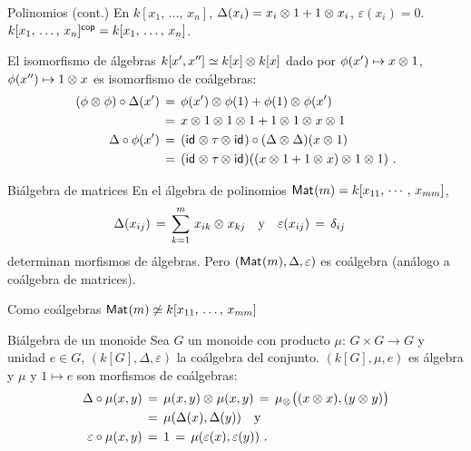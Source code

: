 \begin{frame}{Polinomios (cont.)}
	En $k[x_1,\,\dots,\,x_n]$,
	$\Delta(x_i)=x_i\otimes_{} 1 + 1\otimes_{} x_i$, $\varepsilon(x_i)=0$.
	$k[x_1,\,\dots,\,x_n]^{\mathsf{cop}}=k[x_1,\,\dots,\,x_n]$.

	\begin{obsPolinomios}\label{obs:polinomios}
		El isomorfismo de \'{a}lgebras
		$k[x',x'']\simeq k[x]\otimes_{} k[x]$ dado por
		$\phi(x')\mapsto x\otimes_{} 1$, $\phi(x'')\mapsto 1\otimes_{} x$ es
		isomorfismo de co\'{a}lgebras:
		\begin{align*}
			(\phi\otimes_{}\phi)\circ\Delta(x') & \,=\,
				\phi(x')\otimes_{}\phi(1) + \phi(1)\otimes_{}\phi(x')
				\\
			& \,=\,x\otimes_{} 1\otimes_{} 1\otimes_{} 1 +
				1\otimes_{} 1\otimes_{} x\otimes_{} 1 \\
			\Delta\circ\phi(x') & \,=\,
				(\mathsf{id}_{}\otimes_{}\tau_{}\otimes_{}\mathsf{id}_{})\circ
				(\Delta\otimes_{}\Delta)(x\otimes_{} 1) \\
			& \,=\,(\mathsf{id}_{}\otimes_{}\tau_{}\otimes_{}\mathsf{id}_{})(
				(x\otimes_{} 1 +1\otimes_{} x)\otimes_{} 1\otimes_{} 1)
			\text{ .}
		\end{align*}
	\end{obsPolinomios}
\end{frame}

\begin{frame}{Bi\'{a}lgebra de matrices}
	En el \'{a}lgebra de polinomios $\mathsf{Mat}_{}(m)=k[x_{11},\,\cdots,\,x_{mm}]$,
	\begin{align*}
		\Delta(x_{ij}) \,=\,\sum_{k=1}^{m}\,
			x_{ik}\otimes_{} x_{kj} & \quad\text{y}\quad
		\varepsilon(x_{ij}) \,=\,\delta_{ij}
	\end{align*}
	determinan morfismos de \'{a}lgebras. Pero
	$(\mathsf{Mat}_{}(m),\Delta,\varepsilon)$ es co\'{a}lgebra (an\'{a}logo a
	co\'{a}lgebra de matrices).
	\begin{obsBialgebraDeMatrices}\label{obs:bialgebradematrices}
		Como co\'{a}lgebras
		$\mathsf{Mat}_{}(m)\not\simeq k[x_{11},\,\dots,\,x_{mm}]$
	\end{obsBialgebraDeMatrices}
\end{frame}

\begin{frame}{Bi\'{a}lgebra de un monoide}
	Sea $G$ un monoide con producto $\mu:\,G\times G\rightarrow G$ y unidad
	$e\in G$, $(k[G],\Delta,\varepsilon)$ la co\'{a}lgebra del conjunto.
	$(k[G],\mu,e)$ es \'{a}lgebra y $\mu$ y $1\mapsto e$ son morfismos de
	co\'{a}lgebras:
	\begin{align*}
		\Delta\circ\mu(x,y) & \,=\,\mu(x,y)\otimes_{}\mu(x,y) \,=\,
			\mu_{\otimes_{}}\big((x\otimes_{} x),(y\otimes_{} y)\big) \\
		& \,=\,\mu(\Delta(x),\Delta(y)) \quad\text{y} \\
		\varepsilon\circ\mu(x,y) & \,=\,1 \,=\,
			\mu(\varepsilon(x),\varepsilon(y))
		\text{ .}
	\end{align*}
\end{frame}
